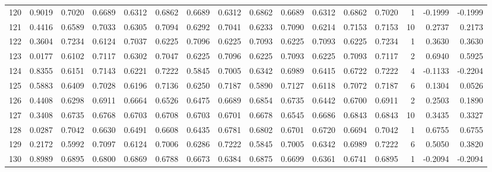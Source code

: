 \begin{tabular}{lrrrrrrrrrrrrrrr}
120 &      0.9019 &  0.7020 &  0.6689 &  0.6312 &  0.6862 &  0.6689 &  0.6312 &  0.6862 &  0.6689 &  0.6312 &   0.6862 &     0.7020 &      1 &                   -0.1999 &                    -0.1999 \\
121 &      0.4416 &  0.6589 &  0.7033 &  0.6305 &  0.7094 &  0.6292 &  0.7041 &  0.6233 &  0.7090 &  0.6214 &   0.7153 &     0.7153 &     10 &                    0.2737 &                     0.2173 \\
122 &      0.3604 &  0.7234 &  0.6124 &  0.7037 &  0.6225 &  0.7096 &  0.6225 &  0.7093 &  0.6225 &  0.7093 &   0.6225 &     0.7234 &      1 &                    0.3630 &                     0.3630 \\
123 &      0.0177 &  0.6102 &  0.7117 &  0.6302 &  0.7047 &  0.6225 &  0.7096 &  0.6225 &  0.7093 &  0.6225 &   0.7093 &     0.7117 &      2 &                    0.6940 &                     0.5925 \\
124 &      0.8355 &  0.6151 &  0.7143 &  0.6221 &  0.7222 &  0.5845 &  0.7005 &  0.6342 &  0.6989 &  0.6415 &   0.6722 &     0.7222 &      4 &                   -0.1133 &                    -0.2204 \\
125 &      0.5883 &  0.6409 &  0.7028 &  0.6196 &  0.7136 &  0.6250 &  0.7187 &  0.5890 &  0.7127 &  0.6118 &   0.7072 &     0.7187 &      6 &                    0.1304 &                     0.0526 \\
126 &      0.4408 &  0.6298 &  0.6911 &  0.6664 &  0.6526 &  0.6475 &  0.6689 &  0.6854 &  0.6735 &  0.6442 &   0.6700 &     0.6911 &      2 &                    0.2503 &                     0.1890 \\
127 &      0.3408 &  0.6735 &  0.6768 &  0.6703 &  0.6708 &  0.6703 &  0.6701 &  0.6678 &  0.6545 &  0.6686 &   0.6843 &     0.6843 &     10 &                    0.3435 &                     0.3327 \\
128 &      0.0287 &  0.7042 &  0.6630 &  0.6491 &  0.6608 &  0.6435 &  0.6781 &  0.6802 &  0.6701 &  0.6720 &   0.6694 &     0.7042 &      1 &                    0.6755 &                     0.6755 \\
129 &      0.2172 &  0.5992 &  0.7097 &  0.6124 &  0.7006 &  0.6286 &  0.7222 &  0.5845 &  0.7005 &  0.6342 &   0.6989 &     0.7222 &      6 &                    0.5050 &                     0.3820 \\
130 &      0.8989 &  0.6895 &  0.6800 &  0.6869 &  0.6788 &  0.6673 &  0.6384 &  0.6875 &  0.6699 &  0.6361 &   0.6741 &     0.6895 &      1 &                   -0.2094 &                    -0.2094 \\

\end{tabular}
